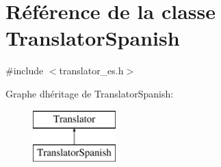 \hypertarget{class_translator_spanish}{}\section{Référence de la classe Translator\+Spanish}
\label{class_translator_spanish}


{\ttfamily \#include $<$translator\+\_\+es.\+h$>$}

Graphe d\textquotesingle{}héritage de Translator\+Spanish\+:\begin{figure}[H]
\begin{center}
\leavevmode
\includegraphics[height=2.000000cm]{class_translator_spanish}
\end{center}
\end{figure}
